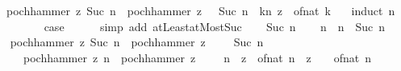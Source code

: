 \begin{isabellebody}
\ \ \ {\isachardoublequoteopen}pochhammer\ z\ {\isacharparenleft}{\kern0pt}Suc\ n{\isacharparenright}{\kern0pt}\ {\isacharasterisk}{\kern0pt}\ pochhammer\ {\isacharparenleft}{\kern0pt}z\ {\isacharplus}{\kern0pt}\ {}{\isacharslash}{\kern0pt}{}{\isacharparenright}{\kern0pt}\ {\isacharparenleft}{\kern0pt}Suc\ n{\isacharparenright}{\kern0pt}\ {\isacharequal}{\kern0pt}\ {\isacharparenleft}{\kern0pt}{\isasymProd}k{\isacharequal}{\kern0pt}{}{\isachardot}{\kern0pt}{\isachardot}{\kern0pt}{}{\isacharasterisk}{\kern0pt}n{\isacharplus}{\kern0pt}{}{\isachardot}{\kern0pt}\ z\ {\isacharplus}{\kern0pt}\ of{\isacharunderscore}{\kern0pt}nat\ k\ {\isacharslash}{\kern0pt}\ {}{\isacharparenright}{\kern0pt}{\isachardoublequoteclose}\isanewline
%
\isadelimproof
%
\endisadelimproof
%
\isatagproof
{}\isamarkupfalse%
\ {\isacharparenleft}{\kern0pt}induct\ n{\isacharparenright}{\kern0pt}\isanewline
\ \ \isamarkupfalse%
\ {}\isanewline
\ \ \isamarkupfalse%
\ \isamarkupfalse%
\ {\isacharquery}{\kern0pt}case\isanewline
\ \ \ \ \isamarkupfalse%
\ {\isacharparenleft}{\kern0pt}simp\ add{\isacharcolon}{\kern0pt}\ atLeast{}{\isacharunderscore}{\kern0pt}atMost{\isacharunderscore}{\kern0pt}Suc{\isacharparenright}{\kern0pt}\isanewline
{}\isamarkupfalse%
\isanewline
\ \ \isamarkupfalse%
\ {\isacharparenleft}{\kern0pt}Suc\ n{\isacharparenright}{\kern0pt}\isanewline
\ \ \isamarkupfalse%
\ n{\isacharprime}{\kern0pt}\ \ {\isachardoublequoteopen}n{\isacharprime}{\kern0pt}\ {\isacharequal}{\kern0pt}\ Suc\ n{\isachardoublequoteclose}\isanewline
\ \ \isamarkupfalse%
\ {\isachardoublequoteopen}pochhammer\ z\ {\isacharparenleft}{\kern0pt}Suc\ n{\isacharprime}{\kern0pt}{\isacharparenright}{\kern0pt}\ {\isacharasterisk}{\kern0pt}\ pochhammer\ {\isacharparenleft}{\kern0pt}z\ {\isacharplus}{\kern0pt}\ {}\ {\isacharslash}{\kern0pt}\ {}{\isacharparenright}{\kern0pt}\ {\isacharparenleft}{\kern0pt}Suc\ n{\isacharprime}{\kern0pt}{\isacharparenright}{\kern0pt}\ {\isacharequal}{\kern0pt}\isanewline
\ \ \ \ \ \ {\isacharparenleft}{\kern0pt}pochhammer\ z\ n{\isacharprime}{\kern0pt}\ {\isacharasterisk}{\kern0pt}\ pochhammer\ {\isacharparenleft}{\kern0pt}z\ {\isacharplus}{\kern0pt}\ {}\ {\isacharslash}{\kern0pt}\ {}{\isacharparenright}{\kern0pt}\ n{\isacharprime}{\kern0pt}{\isacharparenright}{\kern0pt}\ {\isacharasterisk}{\kern0pt}\ {\isacharparenleft}{\kern0pt}{\isacharparenleft}{\kern0pt}z\ {\isacharplus}{\kern0pt}\ of{\isacharunderscore}{\kern0pt}nat\ n{\isacharprime}{\kern0pt}{\isacharparenright}{\kern0pt}\ {\isacharasterisk}{\kern0pt}\ {\isacharparenleft}{\kern0pt}z\ {\isacharplus}{\kern0pt}\ {}{\isacharslash}{\kern0pt}{}\ {\isacharplus}{\kern0pt}\ of{\isacharunderscore}{\kern0pt}nat\ n{\isacharprime}{\kern0pt}{\isacharparenright}{\kern0pt}{\isacharparenright}{\kern0pt}{\isachardoublequoteclose}\isanewline

\end{isabellebody}
